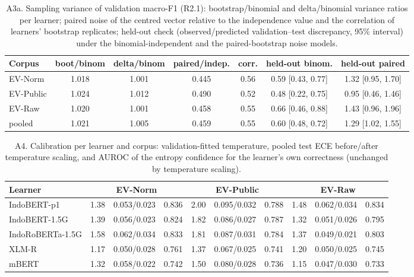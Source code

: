 \begin{table}[!htbp]\centering\scriptsize
\caption*{A3a. Sampling variance of validation macro-F1 (R2.1): bootstrap/binomial and delta/binomial variance ratios per learner; paired noise of the centred vector relative to the independence value and the correlation of learners' bootstrap replicates; held-out check (observed/predicted validation--test discrepancy, 95\% interval) under the binomial-independent and the paired-bootstrap noise models.}
\begin{tabular}{lcccccc}\toprule
Corpus & boot/binom & delta/binom & paired/indep. & corr. & held-out binom. & held-out paired \\ \midrule
EV-Norm & 1.018 & 1.001 & 0.445 & 0.56 & 0.59 [0.43, 0.77] & 1.32 [0.95, 1.70] \\
EV-Public & 1.024 & 1.012 & 0.490 & 0.52 & 0.48 [0.22, 0.75] & 0.95 [0.46, 1.46] \\
EV-Raw & 1.020 & 1.001 & 0.458 & 0.55 & 0.66 [0.46, 0.88] & 1.43 [0.96, 1.96] \\
pooled & 1.021 & 1.005 & 0.459 & 0.55 & 0.60 [0.48, 0.72] & 1.29 [1.02, 1.55] \\
\bottomrule\end{tabular}\end{table}

\begin{table}[!htbp]\centering\scriptsize\setlength{\tabcolsep}{2.5pt}
\caption*{A4. Calibration per learner and corpus: validation-fitted temperature, pooled test ECE before/after temperature scaling, and AUROC of the entropy confidence for the learner's own correctness (unchanged by temperature scaling).}
\begin{tabular}{lccccccccc}\toprule
Learner & \multicolumn{3}{c}{EV-Norm} & \multicolumn{3}{c}{EV-Public} & \multicolumn{3}{c}{EV-Raw} \\ \midrule
IndoBERT-p1 & 1.38 & 0.053/0.023 & 0.836 & 2.00 & 0.095/0.032 & 0.788 & 1.48 & 0.062/0.034 & 0.834 \\
IndoBERT-1.5G & 1.39 & 0.056/0.023 & 0.824 & 1.82 & 0.086/0.027 & 0.787 & 1.32 & 0.051/0.026 & 0.795 \\
IndoRoBERTa-1.5G & 1.58 & 0.062/0.034 & 0.833 & 1.81 & 0.087/0.031 & 0.784 & 1.37 & 0.049/0.021 & 0.803 \\
XLM-R & 1.17 & 0.050/0.028 & 0.761 & 1.37 & 0.067/0.025 & 0.741 & 1.20 & 0.050/0.025 & 0.745 \\
mBERT & 1.32 & 0.058/0.022 & 0.742 & 1.50 & 0.080/0.028 & 0.736 & 1.15 & 0.047/0.030 & 0.733 \\
\bottomrule\end{tabular}\end{table}

